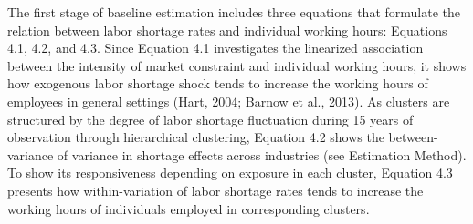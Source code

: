 \documentclass[
  12pt,
]{article}
\begin{document}
The first stage of baseline estimation includes three equations that
formulate the relation between labor shortage rates and individual
working hours: Equations 4.1, 4.2, and 4.3. Since Equation 4.1
investigates the linearized association between the intensity of market
constraint and individual working hours, it shows how exogenous labor
shortage shock tends to increase the working hours of employees in
general settings (Hart, 2004; Barnow et al., 2013). As clusters are
structured by the degree of labor shortage fluctuation during 15 years
of observation through hierarchical clustering, Equation 4.2 shows the
between-variance of variance in shortage effects across industries (see
Estimation Method). To show its responsiveness depending on exposure in
each cluster, Equation 4.3 presents how within-variation of labor
shortage rates tends to increase the working hours of individuals
employed in corresponding clusters.
\end{document}

